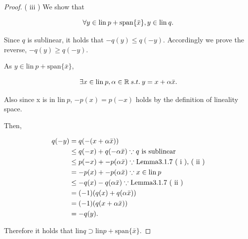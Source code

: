 \documentclass[a4paper,11pt]{jsarticle}
\begin{document}
\begin{proof}
  ( $\mathrm{iii}$ ) We show that

  \begin{equation}
    \forall y \in \text{lin}\:p + \text{span}\{\bar{x}\}, y \in \text{lin}\:q. \notag
  \end{equation}

  Since $q$ is sublinear, it holds that $-q(y) \leq q(-y)$. Accordingly we prove the reverse, $-q(y) \geq q(-y)$.

  As $y \in \text{lin}\:p + \text{span}\{\bar{x}\}$,

  \begin{equation}
    \exists x \in \text{lin}\:p, \alpha \in \mathbb{R} \:s.t.\: y=x+\alpha \bar{x}. \notag
  \end{equation}

  Also since x is in $\text{lin}\:p$, $-p(x)=p(-x)$ holds by the definition of lineality space.

  Then,

  \begin{equation}
    \begin{split}
      q(-y) &= q(-(x+\alpha \bar{x}))\\
      &\leq q(-x) + q(-\alpha \bar{x}) \because \text{$q$ is sublinear}\\
      &\leq p(-x) + -p(\alpha \bar{x}) \because \text{Lemma3.1.7 ( $\mathrm{i}$ ), ( $\mathrm{ii}$ )}\\
      &= -p(x) + -p(\alpha \bar{x}) \because \text{$x \in \text{lin}\:p$}\\
      &\leq -q(x) - q(\alpha \bar{x}) \because \text{Lemma3.1.7 ( $\mathrm{ii}$ )}\\
      &= (-1)(q(x)+q(\alpha \bar{x}))\\
      &= (-1)(q(x+\alpha \bar{x}))\\
      &= -q(y). \notag
    \end{split}
  \end{equation}

  Therefore it holds that $\text{lin}q \supset \text{lin}p + \text{span}\{\bar{x}\}$.

\end{proof}

\begin{center}
\end{center}
\end{document}
